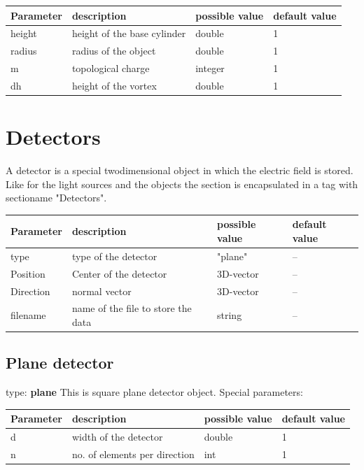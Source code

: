 \documentclass[a4paper,html,11pt,openany]{book}
\begin{document}
\vspace{1em}
\begin{tabular}{p{2cm}|m{3.5cm}|m{3.0cm}|p{1.7cm}}
 Parameter  & description  & possible value & default value\\
 \hline
 height & height of the base cylinder & double & 1 \\
 \hline
 radius & radius of the object & double & 1 \\
 \hline
 m & topological charge & integer & 1\\
 \hline
 dh & height of the vortex & double & 1 \\
 \end{tabular}
 
 \section{Detectors}
 A detector is a special twodimensional object in which the electric field is stored. Like for the light sources and the objects the section is encapsulated in a tag with sectioname "Detectors". 
  
 \vspace{1em} 
\begin{tabular}{p{2cm}|m{3.5cm}|m{3.0cm}|p{1.7cm}}
 Parameter  & description  & possible value & default value\\
 \hline 
 type & type of the detector & "plane" & -- \\
 \hline
 Position & Center of the detector & 3D-vector & -- \\
 \hline
 Direction & normal vector & 3D-vector & -- \\
 \hline  
 filename & name of the file to store the data & string & -- \\
  \end{tabular}
  
 \subsection{Plane detector}
 type: \textbf{plane}
 This is square plane detector object. \newline
 Special parameters: 
 
 \vspace{1em} 
\begin{tabular}{p{2cm}|m{3.5cm}|m{3.0cm}|p{1.7cm}}
 Parameter  & description  & possible value & default value\\
 \hline 
d & width of the detector & double & 1 \\
\hline
n & no. of elements per direction & int & 1 \\ 
\end{tabular}
 
\end{document}
